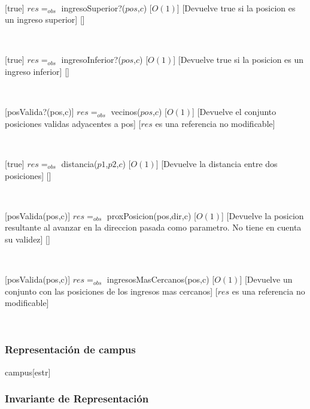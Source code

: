 ~

[true]
{$res =_{obs}$ ingresoSuperior?($pos$,$c$)}
[$O(1)$]
[Devuelve true si la posicion es un ingreso superior]
[]

~

[true]
{$res =_{obs}$ ingresoInferior?($pos$,$c$)}
[$O(1)$]
[Devuelve true si la posicion es un ingreso inferior]
[]

~

[posValida?(pos,c)]
{$res =_{obs}$ vecinos($pos$,$c$)}
[$O(1)$]
[Devuelve el conjunto posiciones validas adyacentes a pos]
[$res$ es una referencia no modificable]

~

[true]
{$res =_{obs}$ distancia($p1$,$p2$,$c$)}
[$O(1)$]
[Devuelve la distancia entre dos posiciones]
[]

~

[posValida(pos,c)]
{$res =_{obs}$ proxPosicion(pos,dir,c)}
[$O(1)$]
[Devuelve la posicion resultante al avanzar en la direccion pasada como parametro. No tiene en cuenta su validez]
[]

~

[posValida(pos,c)]
{$res =_{obs}$ ingresosMasCercanos(pos,c)}
[$O(1)$]
[Devuelve un conjunto con las posiciones de los ingresos mas cercanos]
[$res$ es una referencia no modificable]

~

\pagebreak

\subsubsection{Representación de campus}

\begin{Estructura}{campus}[estr]
	\begin{Tupla}[estr]
	\end{Tupla}
\end{Estructura}

\subsubsection{Invariante de Representación}

